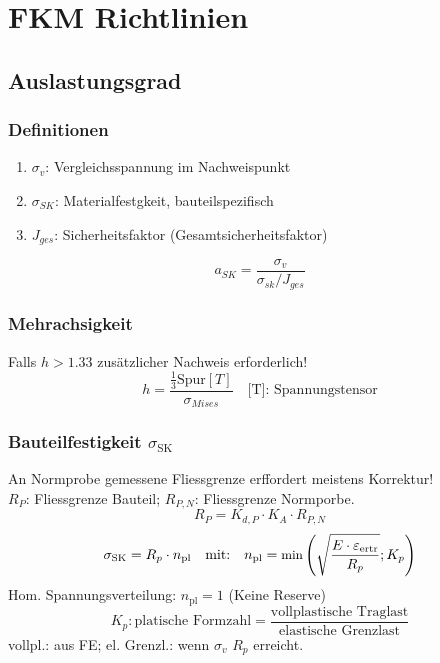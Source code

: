 \vspace{-3mm}
\section{FKM Richtlinien}{}
    \subsection{Auslastungsgrad}
     
        \subsubsection{Definitionen}
            \begin{enumerate}[noitemsep]
                \item $\sigma_{v}$: Vergleichsspannung im Nachweispunkt
                \item $\sigma_{SK}$: Materialfestgkeit, bauteilspezifisch
                \item $J_{ges}$: Sicherheitsfaktor (Gesamtsicherheitsfaktor)
            \end{enumerate}
            \[a_{SK} = \frac{\sigma_{v}}{\sigma_{sk}/J_{ges}} \]
    
        \subsubsection{Mehrachsigkeit}
            Falls $h > 1.33$ zusätzlicher Nachweis erforderlich! 
            \[ h = \frac{\frac{1}{3} \textrm{Spur}[T]}{\sigma_{Mises}} \quad \textrm{[T]: Spannungstensor}\]
        \subsubsection{Bauteilfestigkeit $\sigma_{\textrm{SK}}$}
            An Normprobe gemessene Fliessgrenze erffordert meistens Korrektur! \\$R_P$: Fliessgrenze Bauteil; $R_{P,N}$: Fliessgrenze Normporbe.
            \vspace{-2mm}
            \[R_P = K_{d,P}\cdot K_A\cdot R_{P,N}\]
            \vspace{-5mm}
            \[\sigma_{\textrm{SK}}=R_p\cdot n_{\textrm{pl}} \quad\textrm{mit:}\quad \small n_{\textrm{pl}}=\textrm{min} \left( \sqrt{ \frac{E\cdot\varepsilon_{\textrm{ertr}}}{R_p}};K_p \right) \]\normalsize
            Hom. Spannungsverteilung: $n_{\textrm{pl}}=1$ (Keine Reserve)
            \vspace{-2mm}
            \[K_p: \textrm{platische Formzahl} = \frac{\textrm{vollplastische Traglast}}{\textrm{elastische Grenzlast}}\]
            vollpl.: aus FE; el. Grenzl.: wenn $\sigma_v$ $R_p$ erreicht.

